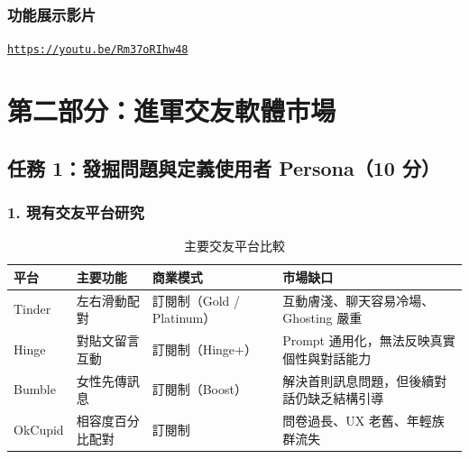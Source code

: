 \documentclass[12pt, a4paper]{article}
\begin{document}
\subsubsection*{功能展示影片}

\begin{tcolorbox}[colback=lightgreen, colframe=green!60!black, title=功能展示影片（YouTube）]
\href{https://youtu.be/Rm37oRIhw48}{\texttt{https://youtu.be/Rm37oRIhw48}}
\end{tcolorbox}

\newpage

\section*{第二部分：進軍交友軟體市場}

\subsection*{任務 1：發掘問題與定義使用者 Persona（10 分）}

\subsubsection*{1. 現有交友平台研究}

\begin{table}[H]
\centering
\begin{tabularx}{\textwidth}{lXXX}
\toprule
\textbf{平台} & \textbf{主要功能} & \textbf{商業模式} & \textbf{市場缺口} \\
\midrule
Tinder & 左右滑動配對 & 訂閱制（Gold / Platinum）& 互動膚淺、聊天容易冷場、Ghosting 嚴重 \\
\midrule
Hinge & 對貼文留言互動 & 訂閱制（Hinge+）& Prompt 通用化，無法反映真實個性與對話能力 \\
\midrule
Bumble & 女性先傳訊息 & 訂閱制（Boost）& 解決首則訊息問題，但後續對話仍缺乏結構引導 \\
\midrule
OkCupid & 相容度百分比配對 & 訂閱制 & 問卷過長、UX 老舊、年輕族群流失 \\
\bottomrule
\end{tabularx}
\caption{主要交友平台比較}
\end{table}
\end{document}
